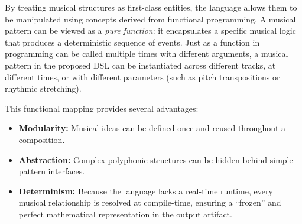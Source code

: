 By treating musical structures as first-class entities, the language allows them to be manipulated using concepts
derived from functional programming.
A musical pattern can be viewed as a \textit{pure function}: it encapsulates a specific musical logic that produces a
deterministic sequence of events.
Just as a function in programming can be called multiple times with different arguments, a musical pattern in the
proposed DSL can be instantiated across different tracks, at different times, or with different parameters (such as
pitch transpositions or rhythmic stretching).

This functional mapping provides several advantages:
\begin{itemize}
  \item \textbf{Modularity:} Musical ideas can be defined once and reused throughout a composition.
  \item \textbf{Abstraction:} Complex polyphonic structures can be hidden behind simple pattern interfaces.
  \item \textbf{Determinism:} Because the language lacks a real-time runtime, every musical relationship is
    resolved at compile-time, ensuring a ``frozen'' and perfect mathematical representation in the output artifact.
\end{itemize}
